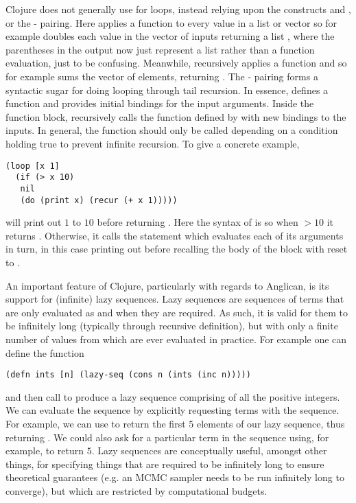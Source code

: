 Clojure does not generally use
for loops, instead relying upon the constructs \map and \reduce, or the - pairing. Here
\map applies a function to every value in a list or vector so for example {\small {}}
doubles each value in the vector of inputs returning a list {\small {}}, where the parentheses in the output
now just represent a list rather than a function evaluation, just to be confusing.  Meanwhile, \reduce recursively applies
a function and so for example {\small {}} sums the vector of elements,
returning {\small {}}.  The - pairing forms
a syntactic sugar for doing looping through tail recursion.  In essence,  defines a function and provides
initial bindings for the input arguments.  Inside the  function block,  recursively calls the
function defined by  with new bindings to the inputs.  In general, the  function should
only be called depending on a condition holding true to prevent infinite recursion.  To give a concrete example,
 \begin{lstlisting}[basicstyle=\ttfamily\small,frame=none]
 (loop [x 1] 
  (if (> x 10) 
   nil 
   (do (print x) (recur (+ x 1)))))
 \end{lstlisting}\vspace{-5pt}
will print out $1$ to $10$ before returning .  
Here the syntax of  is  so when $>10$
it returns .  Otherwise, it calls the  statement which evaluates each of its arguments in turn, in
this case printing out  before recalling the body of the  block with   reset to .

An important feature of Clojure, particularly with regards to Anglican, is its support for (infinite) lazy sequences.
Lazy sequences are sequences of terms that are only evaluated as and when they are required.  As such, it is 
valid for them to be infinitely long (typically through recursive definition), but with only a finite number
of values from which are ever evaluated in practice.    For example one can define the function
 \begin{lstlisting}[basicstyle=\ttfamily\small,frame=none]
 (defn ints [n] (lazy-seq (cons n (ints (inc n)))))
 \end{lstlisting}\vspace{-5pt}
 and then call {\small {}} to produce a
lazy sequence comprising of all the positive integers.  We can evaluate the sequence by explicitly requesting
terms with the sequence.  For example, we can use {\small {}} to return the first $5$ elements
of our lazy sequence, thus returning {\small {}}.  We could also ask for a particular term in the
sequence using, for example, {\small {}} to return $5$.
Lazy sequences are conceptually useful, amongst other things, for specifying things that
are required to be infinitely long to ensure theoretical guarantees (e.g. an MCMC sampler needs to be run
infinitely long to converge), but which are restricted by computational budgets.


